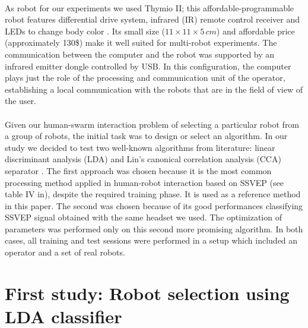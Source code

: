 \documentclass[smallextended]{svjour3}
\begin{document}
\\
As robot for our experiments we used Thymio II; this affordable-programmable robot features differential drive system, infrared (IR) remote control receiver and LEDs to change body color \cite{Riedo-et-al-2013}. Its small size ($11 \times 11 \times 5\,\mathit{cm}$) and affordable price (approximately 130\$) make it well suited for multi-robot experiments. 
The communication between the computer and the robot was supported by an infrared emitter dongle controlled by USB. 
In this configuration, the computer plays just the role of the processing and communication unit of the operator, establishing a local communication with the robots that are in the field of view of the user.\\
\\
Given our human-swarm interaction problem of selecting a particular robot from a group of robots, the initial task was to design or select an algorithm. In our study we decided to test two well-known algorithms from literature: linear discriminant analysis (LDA) \cite{openvibeSSVEP} and Lin's canonical correlation analysis (CCA) separator \cite{Lin2014}. The first approach was chosen because it is the most common processing method applied in human-robot interaction based on SSVEP (see table IV in\cite{Bi2013}), despite the required training phase. It is used as a reference method in this paper. The second was chosen because of its good performances classifying SSVEP signal obtained with the same headset we used. The optimization of parameters was performed only on this second more promising algorithm.
In both cases, all training and test sessions were performed in a setup which included an operator and a set of real robots.\\

\section{First study: Robot selection using LDA classifier}
\label{sec:ML_approach}
\end{document}
